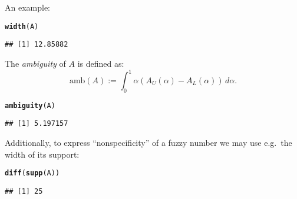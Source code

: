 \documentclass[11pt]{article}\usepackage[]{graphicx}\usepackage[]{color}
\makeatletter
\newcommand{\hlstd}[1]{\textcolor[rgb]{0.345,0.345,0.345}{#1}}%
\newcommand{\hlkwd}[1]{\textcolor[rgb]{0.737,0.353,0.396}{\textbf{#1}}}%
\newenvironment{kframe}{%
 \def\at@end@of@kframe{}%
 \ifinner\ifhmode%
  \def\at@end@of@kframe{\end{minipage}}%
  \begin{minipage}{\columnwidth}%
 \fi\fi%
 \def\FrameCommand##1{\hskip\@totalleftmargin \hskip-\fboxsep
 \colorbox{shadecolor}{##1}\hskip-\fboxsep
     \hskip-\linewidth \hskip-\@totalleftmargin \hskip\columnwidth}%
 \MakeFramed {\advance\hsize-\width
   \@totalleftmargin\z@ \linewidth\hsize
   \@setminipage}}%
 {\par\unskip\endMakeFramed%
 \at@end@of@kframe}
\newenvironment{knitrout}{}{} %
\makeatother
\begin{document}
\noindent
An example:

\begin{knitrout}\small
{}\color{fgcolor}\begin{kframe}
\begin{alltt}
\hlkwd{width}\hlstd{(A)}
\end{alltt}
\begin{verbatim}
## [1] 12.85882
\end{verbatim}
\end{kframe}
\end{knitrout}

\bigskip
The \textit{ambiguity} of $A$ \cite{DelgadoETAL1998:canonicalfn} is defined as:
\begin{equation}
\mathrm{amb}(A) := \int_0^1 \alpha\left(A_U(\alpha)-A_L(\alpha)\right)\,d\alpha.
\end{equation}

\begin{knitrout}\small
{}\color{fgcolor}\begin{kframe}
\begin{alltt}
\hlkwd{ambiguity}\hlstd{(A)}
\end{alltt}
\begin{verbatim}
## [1] 5.197157
\end{verbatim}
\end{kframe}
\end{knitrout}

\bigskip
Additionally, to express ``nonspecificity'' of a fuzzy number
we may use e.g.~the width of its support:

\begin{knitrout}\small
{}\color{fgcolor}\begin{kframe}
\begin{alltt}
\hlkwd{diff}\hlstd{(}\hlkwd{supp}\hlstd{(A))}
\end{alltt}
\begin{verbatim}
## [1] 25
\end{verbatim}
\end{kframe}
\end{knitrout}



\end{document}
